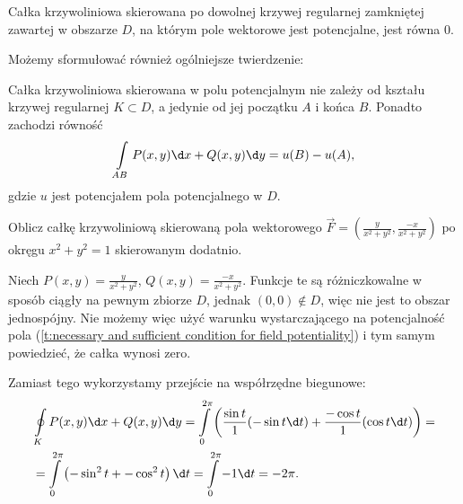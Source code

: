 \begin{corollary}
    Całka krzywoliniowa skierowana po dowolnej krzywej regularnej zamkniętej zawartej w obszarze $D$, na którym pole wektorowe jest potencjalne, jest równa $0$.
\end{corollary}

Możemy sformułować również ogólniejsze twierdzenie:
\begin{theorem}
    Całka krzywoliniowa skierowana w polu potencjalnym nie zależy od kształu krzywej regularnej $K \subset D$, a jedynie od jej początku $A$ i końca $B$. Ponadto zachodzi równość
    \[ \int\limits_{AB} P(x, y) \d x + Q(x, y) \d y = u(B) - u(A), \]
    gdzie $u$ jest potencjałem pola potencjalnego w $D$.
\end{theorem}

\begin{example}
    Oblicz całkę krzywoliniową skierowaną pola wektorowego $\vec{F} = \left(\frac{y}{x^2 + y^2}, \frac{-x}{x^2 + y^2}\right)$ po okręgu $x^2 + y^2 = 1$ skierowanym dodatnio.
\end{example}
\begin{solution}
    Niech $P(x, y) = \frac{y}{x^2 + y^2}$, $Q(x, y) = \frac{-x}{x^2 + y^2}$. Funkcje te są różniczkowalne w sposób ciągły na pewnym zbiorze $D$, jednak $(0, 0) \notin D$, więc nie jest to obszar jednospójny. Nie możemy więc użyć warunku wystarczającego na potencjalność pola (\ref{t:necessary and sufficient condition for field potentiality}) i tym samym powiedzieć, że całka wynosi zero.

    Zamiast tego wykorzystamy przejście na współrzędne biegunowe:
    \begin{align*}
        &\oint\limits_K P(x, y) \d x + Q(x, y) \d y = \int\limits_0^{2\pi}\left( \frac{\sin t}{1} (-\sin t \d t) + \frac{-\cos t}{1} (\cos t \d t)\right) = \\
        &= \int\limits_0^{2\pi}\left(-\sin^2 t + -\cos^2 t \right) \d t = \int\limits_0^{2\pi} -1 \d t = -2 \pi.
    \end{align*}
\end{solution}